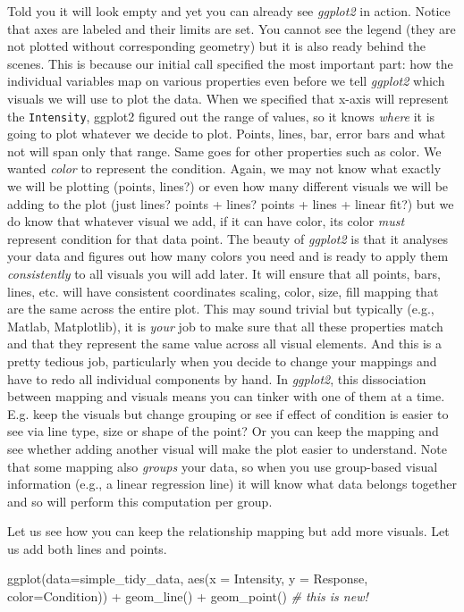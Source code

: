 \documentclass[
]{book}
\newenvironment{Shaded}{\begin{snugshade}}{\end{snugshade}}
\newcommand{\AttributeTok}[1]{\textcolor[rgb]{0.77,0.63,0.00}{#1}}
\newcommand{\CommentTok}[1]{\textcolor[rgb]{0.56,0.35,0.01}{\textit{#1}}}
\newcommand{\FunctionTok}[1]{\textcolor[rgb]{0.00,0.00,0.00}{#1}}
\newcommand{\NormalTok}[1]{#1}
\newcommand{\SpecialCharTok}[1]{\textcolor[rgb]{0.00,0.00,0.00}{#1}}
\begin{document}
Told you it will look empty and yet you can already see \emph{ggplot2} in action. Notice that axes are labeled and their limits are set. You cannot see the legend (they are not plotted without corresponding geometry) but it is also ready behind the scenes. This is because our initial call specified the most important part: how the individual variables map on various properties even before we tell \emph{ggplot2} which visuals we will use to plot the data. When we specified that x-axis will represent the \texttt{Intensity}, ggplot2 figured out the range of values, so it knows \emph{where} it is going to plot whatever we decide to plot. Points, lines, bar, error bars and what not will span only that range. Same goes for other properties such as color. We wanted \emph{color} to represent the condition. Again, we may not know what exactly we will be plotting (points, lines?) or even how many different visuals we will be adding to the plot (just lines? points + lines? points + lines + linear fit?) but we do know that whatever visual we add, if it can have color, its color \emph{must} represent condition for that data point. The beauty of \emph{ggplot2} is that it analyses your data and figures out how many colors you need and is ready to apply them \emph{consistently} to all visuals you will add later. It will ensure that all points, bars, lines, etc. will have consistent coordinates scaling, color, size, fill mapping that are the same across the entire plot. This may sound trivial but typically (e.g., Matlab, Matplotlib), it is \emph{your} job to make sure that all these properties match and that they represent the same value across all visual elements. And this is a pretty tedious job, particularly when you decide to change your mappings and have to redo all individual components by hand. In \emph{ggplot2}, this dissociation between mapping and visuals means you can tinker with one of them at a time. E.g. keep the visuals but change grouping or see if effect of condition is easier to see via line type, size or shape of the point? Or you can keep the mapping and see whether adding another visual will make the plot easier to understand. Note that some mapping also \emph{groups} your data, so when you use group-based visual information (e.g., a linear regression line) it will know what data belongs together and so will perform this computation per group.

Let us see how you can keep the relationship mapping but add more visuals. Let us add both lines and points.

\begin{Shaded}
\begin{Highlighting}[]
\FunctionTok{ggplot}\NormalTok{(}\AttributeTok{data=}\NormalTok{simple\_tidy\_data, }\FunctionTok{aes}\NormalTok{(}\AttributeTok{x =}\NormalTok{ Intensity, }\AttributeTok{y =}\NormalTok{ Response, }\AttributeTok{color=}\NormalTok{Condition)) }\SpecialCharTok{+} 
  \FunctionTok{geom\_line}\NormalTok{() }\SpecialCharTok{+}
  \FunctionTok{geom\_point}\NormalTok{() }\CommentTok{\# this is new!}
\end{Highlighting}
\end{Shaded}
\end{document}
